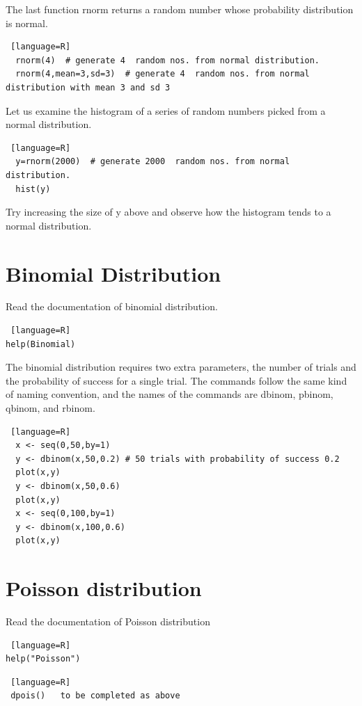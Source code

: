 \documentclass["../Applied_probabillity _and_statistics_lab_KTU.tex"]{subfiles}
\begin{document}
The last function rnorm returns a  random number whose probability distribution is normal.
\begin{lstlisting} [language=R]
  rnorm(4)  # generate 4  random nos. from normal distribution.
  rnorm(4,mean=3,sd=3)  # generate 4  random nos. from normal distribution with mean 3 and sd 3
\end{lstlisting}
Let us examine the histogram of a series of random numbers picked from a normal distribution.


\begin{lstlisting} [language=R]
  y=rnorm(2000)  # generate 2000  random nos. from normal distribution.
  hist(y)
\end{lstlisting}

Try increasing the  size of y above and observe how the histogram tends to a normal distribution.

\section{Binomial Distribution}

Read the documentation of binomial distribution.

\begin{lstlisting} [language=R]
help(Binomial)
\end{lstlisting}

The binomial distribution requires two extra parameters, the number of trials and the probability of success for a single trial. The commands follow the same kind of naming convention, and the names of the commands are dbinom, pbinom, qbinom, and rbinom.
\begin{lstlisting} [language=R]
  x <- seq(0,50,by=1)
  y <- dbinom(x,50,0.2) # 50 trials with probability of success 0.2
  plot(x,y)
  y <- dbinom(x,50,0.6)
  plot(x,y)
  x <- seq(0,100,by=1)
  y <- dbinom(x,100,0.6)
  plot(x,y)
\end{lstlisting}

\section{Poisson distribution}
Read the documentation of Poisson distribution

\begin{lstlisting} [language=R]
help("Poisson")
\end{lstlisting}


\begin{lstlisting} [language=R]
 dpois()   to be completed as above
\end{lstlisting}
\end{document}
